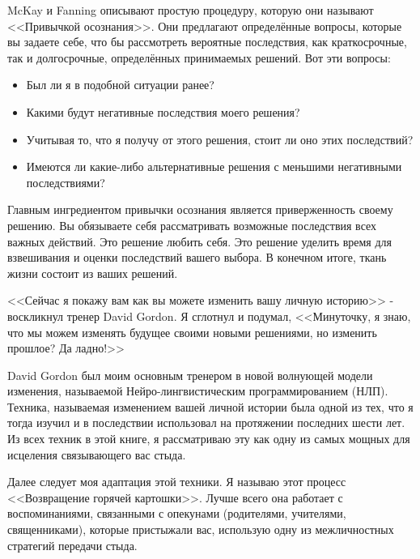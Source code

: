 \documentclass[10pt, fleqn]{article}
\begin{document}

McKay и Fanning описывают простую процедуру, которую они называют <<Привычкой осознания>>. Они предлагают определённые вопросы, которые вы задаете себе, что бы рассмотреть вероятные последствия, как краткосрочные, так и долгосрочные, определённых принимаемых решений. Вот эти вопросы:

\begin{itemize}
\item Был ли я в подобной ситуации ранее?
\item Какими будут негативные последствия моего решения?
\item Учитывая то, что я получу от этого решения, стоит ли оно этих последствий?
\item Имеются ли какие-либо альтернативные решения с меньшими негативными последствиями?
\end{itemize}

Главным ингредиентом привычки осознания является приверженность своему решению. Вы обязываете себя рассматривать возможные последствия всех важных действий. Это решение любить себя. Это решение уделить время для взвешивания и оценки последствий вашего выбора. В конечном итоге, ткань жизни состоит из ваших решений.



<<Сейчас я покажу вам как вы можете изменить вашу личную историю>> - воскликнул тренер David Gordon. Я сглотнул и подумал, <<Минуточку, я знаю, что мы можем изменять будущее своими новыми решениями, но изменить прошлое? Да ладно!>>


David Gordon был моим основным тренером в новой волнующей модели изменения, называемой Нейро-лингвистическим программированием (НЛП). Техника, называемая изменением вашей личной истории была одной из тех, что я тогда изучил и в последствии использовал на протяжении последних шести лет. Из всех техник в этой книге, я рассматриваю эту как одну из самых мощных для исцеления связывающего вас стыда.

Далее следует моя адаптация этой техники. Я называю этот процесс <<Возвращение горячей картошки>>. Лучше всего она работает с воспоминаниями, связанными с опекунами (родителями, учителями, священниками), которые пристыжали вас, использую одну из межличностных стратегий передачи стыда.


\end{document}
